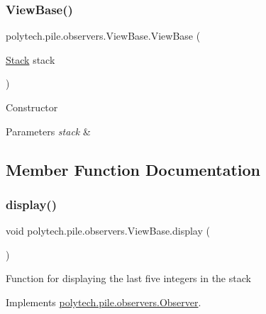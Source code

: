 \subsubsection{\texorpdfstring{View\+Base()}{ViewBase()}}
{\footnotesize\ttfamily polytech.\+pile.\+observers.\+View\+Base.\+View\+Base (\begin{DoxyParamCaption}\item[{\hyperlink{classpolytech_1_1pile_1_1subject_1_1_stack}{Stack}}]{stack }\end{DoxyParamCaption})}

Constructor


\begin{DoxyParams}{Parameters}
{\em stack} & \\
\hline
\end{DoxyParams}


\subsection{Member Function Documentation}
\hypertarget{classpolytech_1_1pile_1_1observers_1_1_view_base_a2f57cb278c30ac5971a977651f7e85e4}{}\label{classpolytech_1_1pile_1_1observers_1_1_view_base_a2f57cb278c30ac5971a977651f7e85e4} 
\subsubsection{\texorpdfstring{display()}{display()}}
{\footnotesize\ttfamily void polytech.\+pile.\+observers.\+View\+Base.\+display (\begin{DoxyParamCaption}{ }\end{DoxyParamCaption})}

Function for displaying the last five integers in the stack 

Implements \hyperlink{interfacepolytech_1_1pile_1_1observers_1_1_observer_a9a2e7784e992cb25888fdb22660f542c}{polytech.\+pile.\+observers.\+Observer}.

\hypertarget{classpolytech_1_1pile_1_1observers_1_1_view_base_a1a3c482d6c7d84c19abd52e0b8ee217d}{}\label{classpolytech_1_1pile_1_1observers_1_1_view_base_a1a3c482d6c7d84c19abd52e0b8ee217d} 
